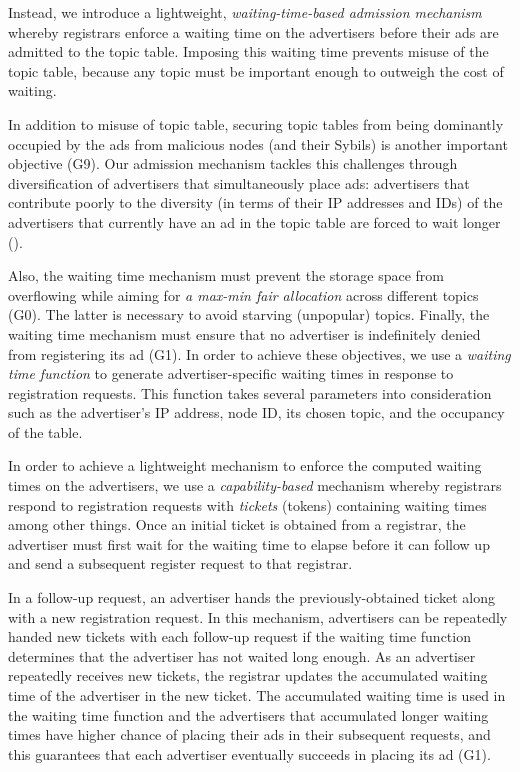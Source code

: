 

Instead, we introduce a lightweight, \textit{waiting-time-based admission mechanism} whereby registrars enforce a waiting time on the advertisers before their ads are admitted to the topic table. Imposing this waiting time prevents misuse of the topic table, because any topic must be important enough to outweigh the cost of waiting. 

In addition to misuse of topic table, securing topic tables from being dominantly occupied by the ads from malicious nodes (and their Sybils) is another important objective (G9). Our admission mechanism tackles this challenges through diversification of advertisers that simultaneously place ads: advertisers that contribute poorly to the diversity (in terms of their IP addresses and IDs) of the advertisers that currently have an ad in the topic table are forced to wait longer ().

Also, the waiting time mechanism must prevent the storage space from overflowing while aiming for \textit{a max-min fair allocation} across different topics (G0). The latter is necessary to avoid starving (unpopular) topics. Finally, the waiting time mechanism must ensure that no advertiser is indefinitely denied from registering its ad (G1). In order to achieve these objectives, we use a \textit{waiting time function} to generate advertiser-specific waiting times in response to registration requests. This function takes several parameters into consideration such as the advertiser's IP address, node ID, its chosen topic, and the occupancy of the table. 

In order to achieve a lightweight mechanism to enforce the computed waiting times on the advertisers, we use a \textit{capability-based} mechanism whereby registrars respond to registration requests with \textit{tickets} (tokens) containing waiting times among other things. Once an initial ticket is obtained from a registrar, the advertiser must first wait for the waiting time to elapse before it can follow up and send a subsequent register request to that registrar. 

In a follow-up request, an advertiser hands the previously-obtained ticket along with a new registration request. In this mechanism, advertisers can be repeatedly handed new tickets with each follow-up request if the waiting time function determines that the advertiser has not waited long enough. As an advertiser repeatedly receives new tickets, the registrar updates the accumulated waiting time of the advertiser in the new ticket. The accumulated waiting time is used in the waiting time function and the advertisers that accumulated longer waiting times have higher chance of placing their ads in their subsequent requests, and this guarantees that each advertiser eventually succeeds in placing its ad (G1). 

